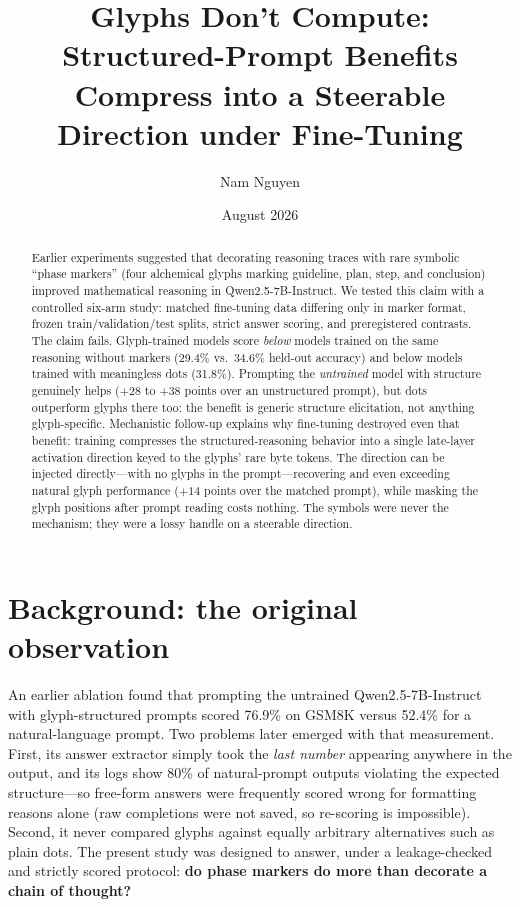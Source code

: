 \documentclass[11pt]{article}
\title{Glyphs Don't Compute:\\
\large Structured-Prompt Benefits Compress into a Steerable Direction under Fine-Tuning}
\author{Nam Nguyen}
\date{August 2026}
\begin{document}
\maketitle

\begin{abstract}
Earlier experiments suggested that decorating reasoning traces with rare symbolic ``phase markers'' (four alchemical glyphs marking guideline, plan, step, and conclusion) improved mathematical reasoning in Qwen2.5-7B-Instruct.
We tested this claim with a controlled six-arm study: matched fine-tuning data differing only in marker format, frozen train/validation/test splits, strict answer scoring, and preregistered contrasts.
The claim fails.
Glyph-trained models score \emph{below} models trained on the same reasoning without markers (29.4\% vs.\ 34.6\% held-out accuracy) and below models trained with meaningless dots (31.8\%).
Prompting the \emph{untrained} model with structure genuinely helps ($+28$ to $+38$ points over an unstructured prompt), but dots outperform glyphs there too: the benefit is generic structure elicitation, not anything glyph-specific.
Mechanistic follow-up explains why fine-tuning destroyed even that benefit: training compresses the structured-reasoning behavior into a single late-layer activation direction keyed to the glyphs' rare byte tokens.
The direction can be injected directly---with no glyphs in the prompt---recovering and even exceeding natural glyph performance ($+14$ points over the matched prompt), while masking the glyph positions after prompt reading costs nothing.
The symbols were never the mechanism; they were a lossy handle on a steerable direction.
\end{abstract}

\section{Background: the original observation}

An earlier ablation found that prompting the untrained Qwen2.5-7B-Instruct with glyph-structured prompts scored 76.9\% on GSM8K versus 52.4\% for a natural-language prompt.
Two problems later emerged with that measurement.
First, its answer extractor simply took the \emph{last number} appearing anywhere in the output, and its logs show 80\% of natural-prompt outputs violating the expected structure---so free-form answers were frequently scored wrong for formatting reasons alone (raw completions were not saved, so re-scoring is impossible).
Second, it never compared glyphs against equally arbitrary alternatives such as plain dots.
The present study was designed to answer, under a leakage-checked and strictly scored protocol: \textbf{do phase markers do more than decorate a chain of thought?}
\end{document}
